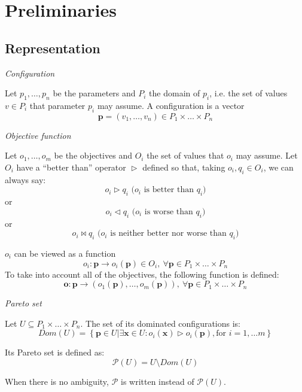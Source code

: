 
\section{Preliminaries}

\subsection{Representation}
\begin{defn}
\emph{Configuration}

Let $p_{1},\dots,p_{n}$ be the parameters and $P_{i}$ the domain
of $p_{i}$, i.e. the set of values $v\in P_{i}$ that parameter $p_{i}$
may assume. A configuration is a vector
\[
\mathbf{p}=\left(v_{1},\dots,v_{n}\right)\in P_{1}\times\dots\times P_{n}
\]

\end{defn}

\begin{defn}
\emph{Objective function}

Let $o_{1},\dots,o_{m}$ be the objectives and $O_{i}$ the set of
values that $o_{i}$ may assume. Let $O_{i}$ have a ``better than''
operator $\vartriangleright$ defined so that, taking $o_{i},q_{i}\in O_{i}$,
we can always say:
\[
o_{i}\vartriangleright q_{i}\mbox{ (}o_{i}\mbox{ is better than }q_{i}\mbox{)}
\]
 or
\[
o_{i}\vartriangleleft q_{i}\mbox{ (}o_{i}\mbox{ is worse than }q_{i}\mbox{)}
\]
 or
\[
o_{i}\bowtie q_{i}\mbox{ (}o_{i}\mbox{ is neither better nor worse than }q_{i}\mbox{)}
\]


$o_{i}$ can be viewed as a function
\[
o_{i}:\mathbf{p}\rightarrow o_{i}\left(\mathbf{p}\right)\in O_{i},\ \forall\mathbf{p}\in P_{1}\times\dots\times P_{n}
\]
 To take into account all of the objectives, the following function
is defined:
\[
\mathbf{o}:\mathbf{p}\rightarrow\left(o_{1}\left(\mathbf{p}\right),\dots,o_{m}\left(\mathbf{p}\right)\right),\ \forall\mathbf{p}\in P_{1}\times\dots\times P_{n}
\]

\end{defn}

\begin{defn}
\emph{\label{pers02.def:Pareto-set}Pareto set}

Let $U\subseteq P_{1}\times\dots\times P_{n}$. The set of its dominated
configurations is:
\[
Dom\left(U\right)=\left\{ \left.\mathbf{p}\in U\right|\exists\mathbf{x}\in U:o_{i}\left(\mathbf{x}\right)\vartriangleright o_{i}\left(\mathbf{p}\right),\mbox{for }i=1,\dots m\right\} 
\]


Its Pareto set is defined as:
\[
\mathscr{P}\left(U\right)=U\setminus Dom\left(U\right)
\]


When there is no ambiguity, $\mathscr{P}$ is written instead of $\mathscr{P}\left(U\right)$.
\end{defn}

